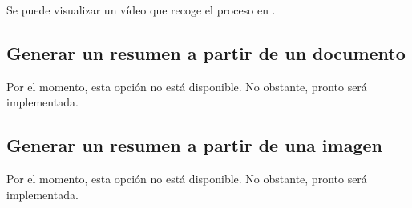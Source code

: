 Se puede visualizar un vídeo que recoge el proceso en \href{}{}.

\subsection{Generar un resumen a partir de un documento}

Por el momento, esta opción no está disponible. No obstante, pronto será implementada.

\subsection{Generar un resumen a partir de una imagen}

Por el momento, esta opción no está disponible. No obstante, pronto será implementada.